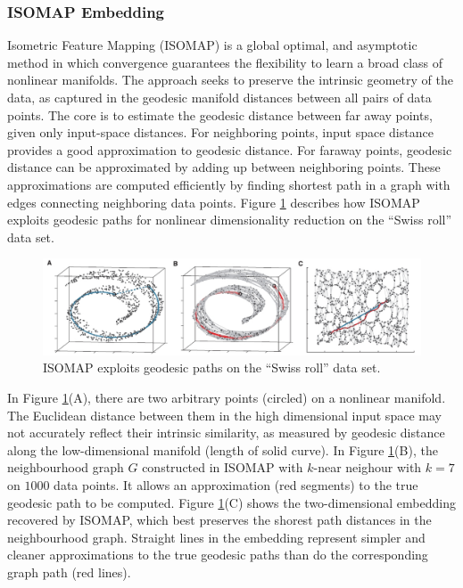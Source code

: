 \subsubsection{ISOMAP Embedding}
Isometric Feature Mapping (ISOMAP) \cite{Tenenbaum2000} is a global optimal, and asymptotic method in which convergence guarantees the flexibility to learn a broad class of nonlinear manifolds. The approach seeks to preserve the intrinsic geometry of the data, as captured in the geodesic manifold distances between all pairs of data points. The core is to estimate the geodesic distance between far away points, given only input-space distances. For neighboring points, input space distance provides a good approximation to geodesic distance. For faraway points, geodesic distance can be approximated by adding up between neighboring points. These approximations are computed efficiently by finding shortest path in a graph with edges connecting neighboring data points. \mbox{Figure} \ref{fig:ISOMAP}  describes how ISOMAP exploits geodesic paths for nonlinear dimensionality reduction on the ``Swiss roll'' data set.
\begin{figure}[ht]
 \begin{center}
  \includegraphics[width=\columnwidth]{ch2/figures/ISOMAP.jpg}
  \caption{ISOMAP exploits geodesic paths on the ``Swiss roll'' data set.}
  \label{fig:ISOMAP}
 \end{center}
\end{figure} 
In \mbox{Figure} \ref{fig:ISOMAP}(A), there are two arbitrary points (circled) on a nonlinear manifold. The Euclidean distance between them in the high dimensional input space may not accurately reflect their intrinsic similarity, as measured by geodesic distance along the low-dimensional manifold (length of solid curve). In \mbox{Figure} \ref{fig:ISOMAP}(B), the neighbourhood graph $G$ constructed in ISOMAP with $k$-near neighour with $k=7$ on $1000$ data points. It allows an approximation (red segments) to the true geodesic path to be computed. \mbox{Figure} \ref{fig:ISOMAP}(C) shows the two-dimensional embedding recovered by ISOMAP, which best preserves the shorest path distances in the neighbourhood graph. Straight lines in the embedding represent simpler and cleaner approximations to the true geodesic paths than do the corresponding graph path (red lines).

